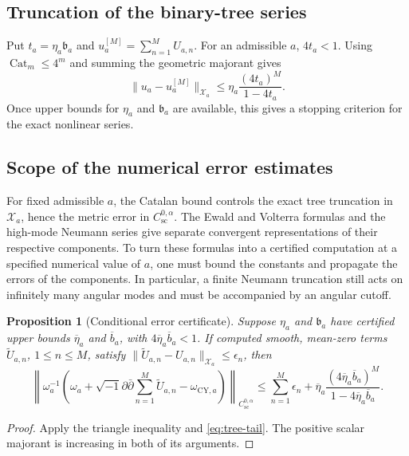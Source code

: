 \documentclass[11pt,a4paper,twoside]{article}
\numberwithin{equation}{section}
\newcommand{\ddc}{\sqrt{-1}\partial\bar\partial}
\newtheorem{proposition}[theorem]{Proposition}
\theoremstyle{definition}
\theoremstyle{remark}
\begin{document}
\subsection{Truncation of the binary-tree series}
\label{subsec:tree-truncation}

Put \(t_a=\eta_a\mathfrak b_a\) and
\(u_a^{[M]}=\sum_{n=1}^{M}U_{a,n}\).
For an admissible \(a\), \(4t_a<1\).
Using \(\operatorname{Cat}_m\le4^m\) and summing the geometric
majorant gives
\begin{equation}\label{eq:tree-tail}
\|u_a-u_a^{[M]}\|_{\mathcal X_a}
\le
\eta_a
\frac{
(4t_a)^M
}{
1-4t_a
}.
\end{equation}
Once upper bounds for \(\eta_a\) and \(\mathfrak b_a\) are
available, this gives a stopping criterion for the exact nonlinear
series.

\subsection{Scope of the numerical error estimates}
\label{subsec:deterministic-evaluation}
For fixed admissible \(a\), the Catalan bound controls the exact
tree truncation in \(\mathcal X_a\), hence the metric error in
\(C_{\mathrm{sc}}^{0,\alpha}\). The Ewald and Volterra formulas and
the high-mode Neumann series give separate convergent representations
of their respective components. To turn these formulas into a
certified computation at a specified numerical value of \(a\), one
must bound the constants and propagate the errors of the components.
In particular, a finite Neumann truncation still acts on infinitely
many angular modes and must be accompanied by an angular cutoff.

\begin{proposition}[Conditional error certificate]
\label{prop:computability}
Suppose \(\eta_a\) and \(\mathfrak b_a\) have certified upper bounds
\(\overline\eta_a\) and \(\overline b_a\), with
\(4\overline\eta_a\overline b_a<1\). If computed smooth, mean-zero
terms \(\widetilde U_{a,n}\), \(1\le n\le M\), satisfy
\(\|\widetilde U_{a,n}-U_{a,n}\|_{\mathcal X_a}\le\epsilon_n\), then
\[
\left\|\omega_a^{-1}
\left(\omega_a+\ddc\sum_{n=1}^M\widetilde U_{a,n}
-\omega_{\mathrm{CY},a}\right)\right\|_{C_{\mathrm{sc}}^{0,\alpha}}
\le\sum_{n=1}^M\epsilon_n+
\overline\eta_a\frac{(4\overline\eta_a\overline b_a)^M}
{1-4\overline\eta_a\overline b_a}.
\]
\end{proposition}
\begin{proof}
Apply the triangle inequality and \eqref{eq:tree-tail}. The positive
scalar majorant is increasing in both of its arguments.
\end{proof}
\end{document}
